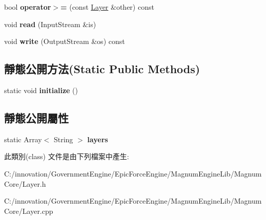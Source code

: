 \begin{DoxyCompactItemize}
\item 
bool {\bfseries operator$>$=} (const \hyperlink{class_magnum_1_1_layer}{Layer} \&other) const \hypertarget{class_magnum_1_1_layer_a0bd629665d6e657d52702fe2c45e73d1}{}\label{class_magnum_1_1_layer_a0bd629665d6e657d52702fe2c45e73d1}

\item 
void {\bfseries read} (Input\+Stream \&is)\hypertarget{class_magnum_1_1_layer_a81ed371d4688ac553d0569779e3f2601}{}\label{class_magnum_1_1_layer_a81ed371d4688ac553d0569779e3f2601}

\item 
void {\bfseries write} (Output\+Stream \&os) const \hypertarget{class_magnum_1_1_layer_aaabff3625bc9ead0ac209bb31ccff3fd}{}\label{class_magnum_1_1_layer_aaabff3625bc9ead0ac209bb31ccff3fd}

\end{DoxyCompactItemize}
\subsection*{靜態公開方法(Static Public Methods)}
\begin{DoxyCompactItemize}
\item 
static void {\bfseries initialize} ()\hypertarget{class_magnum_1_1_layer_a73e3b04ba32db857c1bf935b3153db44}{}\label{class_magnum_1_1_layer_a73e3b04ba32db857c1bf935b3153db44}

\end{DoxyCompactItemize}
\subsection*{靜態公開屬性}
\begin{DoxyCompactItemize}
\item 
static Array$<$ String $>$ {\bfseries layers}\hypertarget{class_magnum_1_1_layer_a05d82a002876614356efa0d93f68d65c}{}\label{class_magnum_1_1_layer_a05d82a002876614356efa0d93f68d65c}

\end{DoxyCompactItemize}


此類別(class) 文件是由下列檔案中產生\+:\begin{DoxyCompactItemize}
\item 
C\+:/innovation/\+Government\+Engine/\+Epic\+Force\+Engine/\+Magnum\+Engine\+Lib/\+Magnum\+Core/Layer.\+h\item 
C\+:/innovation/\+Government\+Engine/\+Epic\+Force\+Engine/\+Magnum\+Engine\+Lib/\+Magnum\+Core/Layer.\+cpp\end{DoxyCompactItemize}
